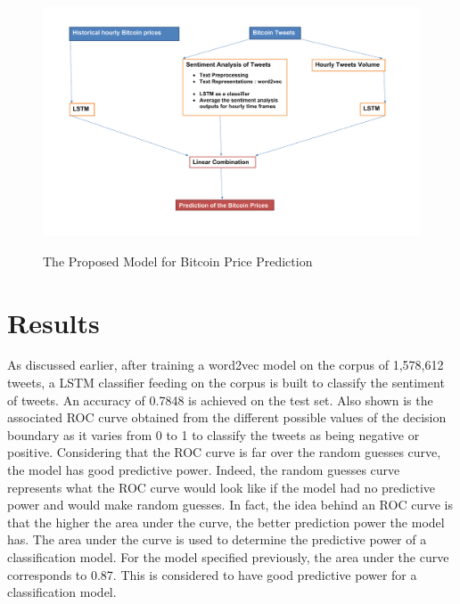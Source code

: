 \documentclass[conference]{IEEEtran}
\begin{document}
\begin{minipage}{\linewidth}
\begin{figure}[H]
\centering
\caption{The Proposed Model for Bitcoin Price Prediction} 
\includegraphics[scale=0.28]{Graphs/PlanProject.pdf}
\label{Project Plan} 
\end{figure}
\end{minipage}

\section{Results}
\par As discussed earlier, after training a word2vec model on the corpus of 1,578,612 tweets, a LSTM classifier feeding on the corpus is built to classify the sentiment of tweets. An accuracy of 0.7848 is achieved on the test set. Also shown is the associated ROC curve obtained from the different possible values of the decision boundary as it varies from 0 to 1 to classify the tweets as being negative or positive. Considering that the ROC curve is far over the random guesses curve, the model has good predictive power. Indeed, the random guesses curve represents what the ROC curve would look like if the model had no predictive power and would make random guesses. In fact, the idea behind an ROC curve is that the higher the area under the curve, the better prediction power the model has. The area under the curve is used to determine the predictive power of a classification model. For the model specified previously, the area under the curve corresponds to 0.87. This is considered to have good predictive power for a classification model.
\end{document}
